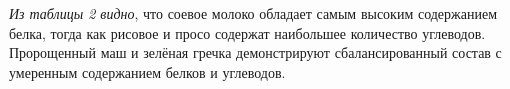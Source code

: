 
\emph{Из таблицы 2 видно}, что соевое молоко обладает самым высоким
содержанием белка, тогда как рисовое и просо содержат наибольшее
количество углеводов. Пророщенный маш и зелёная гречка демонстрируют
сбалансированный состав с умеренным содержанием белков и углеводов.

